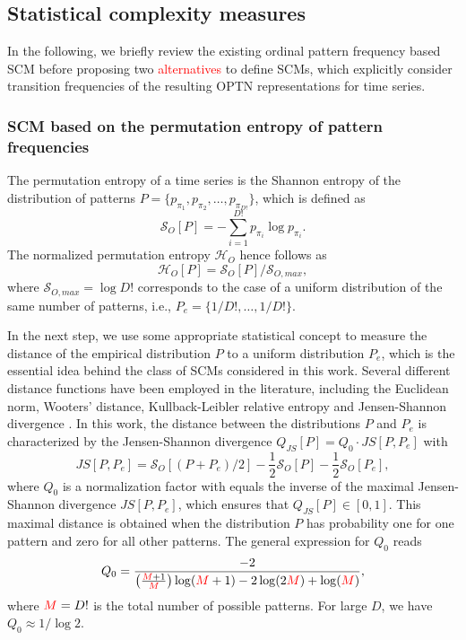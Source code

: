\documentclass[aip,cha,reprint,nofootinbib]{revtex4-1}
\begin{document}
\subsection{Statistical complexity measures} \label{sec:SCM}

In the following, we briefly review the existing ordinal pattern frequency based SCM before proposing two \textcolor{red}{alternatives} to define SCMs, which explicitly consider transition frequencies of the resulting OPTN representations for time series. 
 
\subsubsection{SCM based on the permutation entropy of pattern frequencies} 

The permutation entropy of a time series is the Shannon entropy of the distribution of patterns $P = \{p_{\pi_1}, p_{\pi_2},\ldots,p_{\pi_{D!}} \}$, which is defined as
\begin{equation}
\mathcal{S}_{O}[P]= - \sum_{i=1}^{D!} p_{\pi_i} \log p_{\pi_i}. 
\end{equation}
The normalized permutation entropy $\mathcal{H}_O$ hence follows as 
\begin{equation} \label{eq:Ho}
\mathcal{H}_{O}[P] = \mathcal{S}_{O}[P] / \mathcal{S}_{O, max}, 
\end{equation}
where $\mathcal{S}_{O, max} = \log D!$ corresponds to the case of a uniform distribution of the same number of patterns, i.e., $P_e = \{1/D!, \ldots, 1/D!\}$. 

In the next step, we use some appropriate statistical concept to measure the distance of the empirical distribution $P$ to a uniform distribution $P_e$, which is the essential idea behind the class of SCMs considered in this work. Several different distance functions have been employed in the literature, including the Euclidean norm, Wooters' distance, Kullback-Leibler relative entropy and Jensen-Shannon divergence \cite{kowalskiEntropy2011}. In this work, the distance between the distributions $P$ and $P_e$ is characterized by the Jensen-Shannon divergence $Q_{JS}[P] = Q_0 \cdot JS[P, P_e]$ with 
\begin{equation}
JS[P, P_e] = \mathcal{S}_O[(P+P_e)/2] - \frac{1}{2}\mathcal{S}_O[P] - \frac{1}{2}\mathcal{S}_O[P_e], 
\end{equation}
where $Q_0$ is a normalization factor with equals the inverse of the maximal Jensen-Shannon divergence $JS[P, P_e]$, which ensures that $Q_{JS}[P] \in [0, 1]$. This maximal distance is obtained when the distribution $P$ has probability one for one pattern and zero for all other patterns. The general expression for $Q_0$ reads  
\begin{equation} \label{eq:Q0}
Q_0 = \frac{-2}{\left(\frac{{\color{red}M}+1}{{\color{red}M}}\right) \log ({\color{red}M}+1) -2 \log (2{\color{red}M}) + \log ({\color{red}M})},
\end{equation}
where ${\color{red}M} = D!$ is the total number of possible patterns. For large $D$, we have $Q_0 \approx 1 /  \log 2$. 
\end{document}
